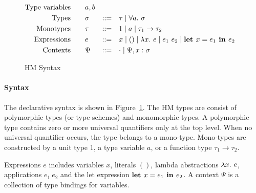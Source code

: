\begin{figure}[t]
    \begin{gather*}
    \begin{aligned}
        \text{Type variables}\qquad&a, b\\
        \text{Types}\qquad&\sigma &::=&\quad \tau \mid \all \sigma\\
        \text{Monotypes}\qquad&\tau &::=&\quad 1 \mid a \mid \tau_1\to \tau_2\\
        \text{Expressions}\qquad&e &::=&\quad x \mid () \mid \lam e \mid e_1~e_2 \mid \letin{e_1}{e_2}\\
        \text{Contexts}\qquad&\Psi &::=&\quad \cdot \mid \Psi, x:\sigma
    \end{aligned}
    \end{gather*}
\caption{HM Syntax}\label{fig:hm_decl_syntax}
\end{figure}

\paragraph{Syntax}
The declarative syntax is shown in Figure~\ref{fig:hm_decl_syntax}.
The HM types are consist of polymorphic types (or type schemes) and monomorphic types.
A polymorphic type contains zero or more universal quantifiers only at the top level.
When no universal quantifier occurs, the type belongs to a mono-type.
Mono-types are constructed by a unit type $1$, a type variable $a$,
or a function type $\tau_1 \to \tau_2$.

Expressions $e$ includes variables $x$, literals $()$, lambda abstractions $\lam e$,
applications $e_1~e_2$ and the let expression $\textbf{let } x={e_1} \textbf{ in } {e_2}$.
A context $\Psi$ is a collection of type bindings for variables.


